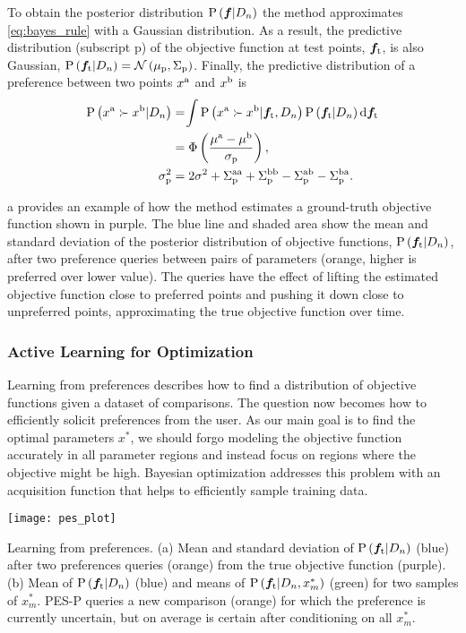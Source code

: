 To obtain the posterior distribution $\prob{\vecf{f}|D_n}$ the method
approximates \cref{eq:bayes_rule} with a Gaussian distribution. As a result, the
predictive distribution (subscript p) of the objective function at test points,
$\vecf{f}[\tn{t}]$, is also Gaussian, $\prob{\vecf{f}[\tn{t}] | D_n} =
\mathcal{N} \left( \mu_\tn{p}, \Sigma_\tn{p} \right)$. Finally, the predictive
distribution of a preference between two points $x^{\mathrm{a}}$ and $x^{\mathrm{b}}$ is 
\begin{align} 
    \prob{x^\tn{a} \succ x^\tn{b} |D_n} 
    &=\hspace{-2pt}\int \prob{x^\tn{a} \succ x^\tn{b}|\vecf{f}[\tn{t}],D_n}
    \prob{\vecf{f}[\tn{t}]| D_n} \tn{d} \vecf{f}[\tn{t}] 
        \label{eq:prob_of_pref}\\
    &= \Phi \left(\frac{\mu^\tn{a} - \mu^\tn{b}}{\sigma_\tn{p}} \right),
        \label{eq:p_pref} \\ 
    \sigma_\tn{p}^2 &= 2\sigma^2 + \Sigma_\tn{p}^\tn{aa} + \Sigma_\tn{p}^\tn{bb}
        - \Sigma_\tn{p}^\tn{ab} - \Sigma_\tn{p}^\tn{ba}.
\end{align}

a provides an example of how the method estimates a
ground-truth objective function shown in purple. The blue line and shaded area show
the mean and standard deviation of the posterior distribution of objective
functions, $\prob{\vecf{f}_\tn{t}|D_n}$, after two preference queries between
pairs of parameters (orange, higher is preferred over lower value). The queries
have the effect of lifting the estimated objective function close to preferred
points and pushing it down close to unpreferred points, approximating the true
objective function over time.

\subsubsection{Active Learning for Optimization}
Learning from preferences describes how to find a distribution of objective
functions given a dataset of comparisons. The question now becomes how to
efficiently solicit preferences from the user. As our main goal is to find the
optimal parameters $x^*$, we should forgo modeling the objective function
accurately in all parameter regions and instead focus on regions where the
objective might be high. Bayesian optimization addresses this problem with an
acquisition function that helps to efficiently sample training data.
\begin{marginfigure}
    \centering
    \texttt{[image: pes\_plot]}
    \caption{Learning from preferences. (a) Mean and standard deviation of
    $\prob{\vecf{f}[\tn{t}]|D_n}$ (blue) after two preferences queries (orange)
    from the true objective function (purple). (b) Mean of
    $\prob{\vecf{f}[\tn{t}]|D_n}$ (blue) and means of
    $\prob{\vecf{f}[\tn{t}]|D_n, x_m^*}$ (green) for two samples of $x_m^*$.
    PES-P queries a new comparison (orange) for which the preference is
    currently uncertain, but on average is certain after conditioning on all
    $x_m^*$.}\label{fig:pes_plot}
\end{marginfigure}

